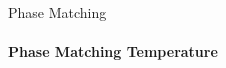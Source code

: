 \documentclass[serif,8pt]{beamer}
\begin{document}
\begin{frame}{Phase Matching}
	\framesubtitle{Phase Matching Temperature}


\end{frame}
\end{document}

